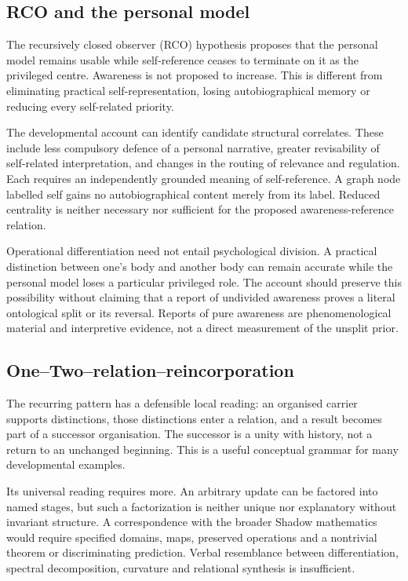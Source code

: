 \documentclass[
  11pt,
  a4paper,
]{article}
\begin{document}
\subsection{RCO and the personal
model}\label{rco-and-the-personal-model}

The recursively closed observer (RCO) hypothesis proposes that the
personal model remains usable while self-reference ceases to terminate
on it as the privileged centre. Awareness is not proposed to increase.
This is different from eliminating practical self-representation, losing
autobiographical memory or reducing every self-related priority.

The developmental account can identify candidate structural correlates.
These include less compulsory defence of a personal narrative, greater
revisability of self-related interpretation, and changes in the routing
of relevance and regulation. Each requires an independently grounded
meaning of self-reference. A graph node labelled self gains no
autobiographical content merely from its label. Reduced centrality is
neither necessary nor sufficient for the proposed awareness-reference
relation.

Operational differentiation need not entail psychological division. A
practical distinction between one's body and another body can remain
accurate while the personal model loses a particular privileged role.
The account should preserve this possibility without claiming that a
report of undivided awareness proves a literal ontological split or its
reversal. Reports of pure awareness are phenomenological material and
interpretive evidence, not a direct measurement of the unsplit prior.

\subsection{One--Two--relation--reincorporation}\label{onetworelationreincorporation}

The recurring pattern has a defensible local reading: an organised
carrier supports distinctions, those distinctions enter a relation, and
a result becomes part of a successor organisation. The successor is a
unity with history, not a return to an unchanged beginning. This is a
useful conceptual grammar for many developmental examples.

Its universal reading requires more. An arbitrary update can be factored
into named stages, but such a factorization is neither unique nor
explanatory without invariant structure. A correspondence with the
broader Shadow mathematics would require specified domains, maps,
preserved operations and a nontrivial theorem or discriminating
prediction. Verbal resemblance between differentiation, spectral
decomposition, curvature and relational synthesis is insufficient.
\end{document}
